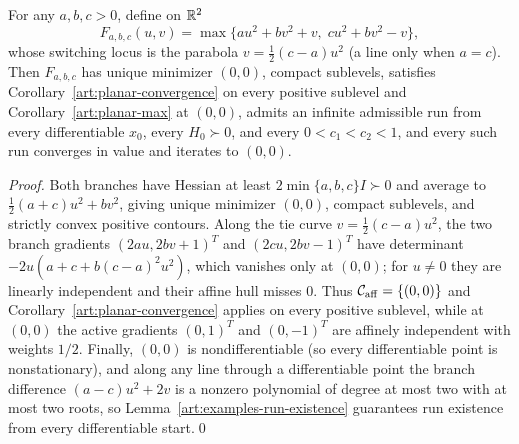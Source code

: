 \begin{proposition}\label{art:examples-two-quadratics}
For any $a,b,c>0$, define on $\mathbb R^2$
\[
 F_{a,b,c}(u,v)=\max\{au^2+bv^2+v,\;cu^2+bv^2-v\},
\]
whose switching locus is the parabola $v=\tfrac12(c-a)u^2$ (a line only when
$a=c$). Then $F_{a,b,c}$ has unique minimizer $(0,0)$, compact sublevels,
satisfies Corollary~\ref{art:planar-convergence} on every positive sublevel and
Corollary~\ref{art:planar-max} at $(0,0)$, admits an infinite admissible run
from every differentiable $x_0$, every $H_0\succ0$, and every $0<c_1<c_2<1$, and
every such run converges in value and iterates to $(0,0)$.
\end{proposition}
\begin{proof}
Both branches have Hessian at least $2\min\{a,b,c\}I\succ0$ and average to
$\tfrac12(a+c)u^2+bv^2$, giving unique minimizer $(0,0)$, compact sublevels, and
strictly convex positive contours. Along the tie curve $v=\tfrac12(c-a)u^2$, the
two branch gradients $(2au,2bv+1)^T$ and $(2cu,2bv-1)^T$ have determinant
$-2u(a+c+b(c-a)^2u^2)$, which vanishes only at $(0,0)$; for $u\ne0$ they are
linearly independent and their affine hull misses $0$. Thus
$\mathcal C_{\rm aff}=\{(0,0)\}$ and Corollary~\ref{art:planar-convergence}
applies on every positive sublevel, while at $(0,0)$ the active gradients
$(0,1)^T$ and $(0,-1)^T$ are affinely independent with weights $1/2$. Finally,
$(0,0)$ is nondifferentiable (so every differentiable point is nonstationary),
and along any line through a differentiable point the branch difference
$(a-c)u^2+2v$ is a nonzero polynomial of degree at most two with at most two
roots, so Lemma~\ref{art:examples-run-existence} guarantees run existence from
every differentiable start.\qed
\end{proof}

